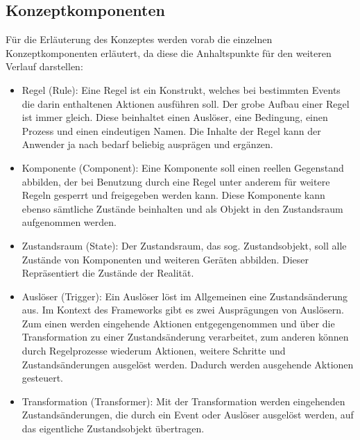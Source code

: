     \subsection{Konzeptkomponenten}
    \label{subsec:conceptcomps}
        Für die Erläuterung des Konzeptes werden vorab die einzelnen Konzeptkomponenten erläutert, da diese die Anhaltspunkte 
        für den weiteren Verlauf darstellen: %
        \begin{itemize} 
            \item Regel (Rule): Eine Regel ist ein Konstrukt, welches bei bestimmten Events die darin enthaltenen Aktionen ausführen soll. 
            Der grobe Aufbau einer Regel ist immer gleich. Diese beinhaltet einen Auslöser, eine Bedingung, einen Prozess und einen eindeutigen 
            Namen. Die Inhalte der Regel kann der Anwender ja nach bedarf beliebig ausprägen und ergänzen. 
            \item Komponente (Component): Eine Komponente soll einen reellen Gegenstand abbilden, der bei Benutzung durch eine Regel unter anderem 
            für weitere Regeln gesperrt und freigegeben werden kann. Diese Komponente kann ebenso sämtliche Zustände beinhalten und als Objekt in den Zustandsraum aufgenommen werden.
            \item Zustandsraum (State): Der Zustandsraum, das sog. Zustandsobjekt, soll alle Zustände von Komponenten und weiteren Geräten abbilden. Dieser Repräsentiert die Zustände der Realität.
            \item Auslöser (Trigger): Ein Auslöser löst im Allgemeinen eine Zustandsänderung aus. Im Kontext des Frameworks gibt es zwei Ausprägungen von 
            Auslösern. Zum einen werden eingehende Aktionen entgegengenommen und über die Transformation zu einer Zustandsänderung verarbeitet, zum anderen können durch Regelprozesse 
            wiederum Aktionen, weitere Schritte und Zustandsänderungen ausgelöst werden. Dadurch werden ausgehende Aktionen gesteuert. 
            \item Transformation (Transformer): Mit der Transformation werden eingehenden Zustandsänderungen, die durch ein Event oder Auslöser ausgelöst werden, 
            auf das eigentliche Zustandsobjekt übertragen. 
        \end{itemize}
